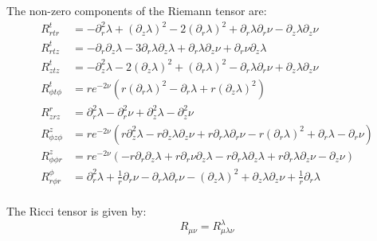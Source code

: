 \documentclass{article}
\begin{document}
The non-zero components of the Riemann tensor are:
\begin{equation}
\begin{aligned}
R^{t}_{rtr}&=-\partial^{2}_{r}\lambda+\left(\partial_{z}\lambda\right)^{2}-2\left(\partial_{r}\lambda\right)^{2}+\partial_{r}\lambda\partial_{r}\nu-\partial_{z}\lambda\partial_{z}\nu\\
R^{t}_{rtz}&=-\partial_{r}\partial_{z}\lambda-3\partial_{r}\lambda\partial_{z}\lambda+\partial_{r}\lambda\partial_{z}\nu+\partial_{r}\nu\partial_{z}\lambda\\
R^{t}_{ztz}&=-\partial^{2}_{z}\lambda-2\left(\partial_{z}\lambda\right)^{2}+\left(\partial_{r}\lambda\right)^{2}-\partial_{r}\lambda\partial_{r}\nu+\partial_{z}\lambda\partial_{z}\nu\\
R^{t}_{\phi t\phi}&=re^{-2\nu}\left(r\left(\partial_{r}\lambda\right)^{2}-\partial_{r}\lambda+r\left(\partial_{z}\lambda\right)^{2}\right)\\
R^{r}_{zrz}&=\partial^{2}_{r}\lambda-\partial^{2}_{r}\nu+\partial^{2}_{z}\lambda-\partial^{2}_{z}\nu\\
R^{z}_{\phi z\phi}&=re^{-2\nu}\left(r\partial^{2}_{z}\lambda-r\partial_{z}\lambda\partial_{z}\nu+r\partial_{r}\lambda\partial_{r}\nu-r\left(\partial_{r}\lambda\right)^{2}+\partial_{r}\lambda-\partial_{r}\nu\right)\\
R^{z}_{\phi\phi r}&=re^{-2\nu}\left(-r\partial_{r}\partial_{z}\lambda+r\partial_{r}\nu\partial_{z}\lambda-r\partial_{r}\lambda\partial_{z}\lambda+r\partial_{r}\lambda\partial_{z}\nu-\partial_{z}\nu\right)\\
R^{\phi}_{r\phi r}&=\partial^{2}_{r}\lambda+\frac{1}{r}\partial_{r}\nu-\partial_{r}\lambda\partial_{r}\nu-\left(\partial_{z}\lambda\right)^{2}+\partial_{z}\lambda\partial_{z}\nu+\frac{1}{r}\partial_{r}\lambda\\
\end{aligned}
\end{equation}

The Ricci tensor is given by:
\begin{equation}
R_{\mu\nu}=R_{\mu\lambda\nu}^{\lambda}
\end{equation}
\end{document}
